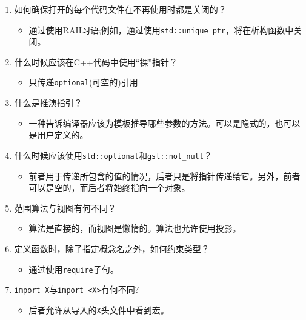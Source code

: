 \begin{enumerate}
\item
如何确保打开的每个代码文件在不再使用时都是关闭的？
\begin{itemize}
\item 
通过使用RAII习语;例如，通过使用\texttt{std::unique\_ptr}，将在析构函数中关闭。
\end{itemize}

\item 
什么时候应该在C++代码中使用“裸”指针？
\begin{itemize}
\item 
只传递\texttt{optional}(可空的)引用
\end{itemize}

\item 
什么是推演指引？
\begin{itemize}
\item 
一种告诉编译器应该为模板推导哪些参数的方法。可以是隐式的，也可以是用户定义的。
\end{itemize}

\item 
什么时候应该使用\texttt{std::optional}和\texttt{gsl::not\_null}？
\begin{itemize}
\item 
前者用于传递所包含的值的情况，后者只是将指针传递给它。另外，前者可以是空的，而后者将始终指向一个对象。
\end{itemize}

\item 
范围算法与视图有何不同？
\begin{itemize}
\item 
算法是直接的，而视图是懒惰的。算法也允许使用投影。
\end{itemize}

\item 
定义函数时，除了指定概念名之外，如何约束类型？
\begin{itemize}
\item 
通过使用\texttt{require}子句。
\end{itemize}

\item 
\texttt{import X}与\texttt{import <X>}有何不同?
\begin{itemize}
\item 
后者允许从导入的\texttt{X}头文件中看到宏。
\end{itemize}
\end{enumerate}